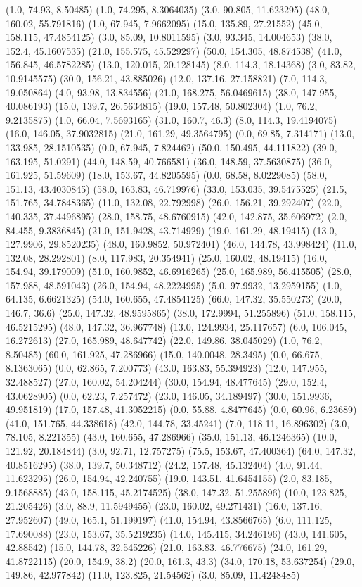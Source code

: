 {(1.0, 74.93, 8.50485) (1.0, 74.295, 8.3064035) (3.0, 90.805, 11.623295) (48.0, 160.02, 55.791816) (1.0, 67.945, 7.9662095) (15.0, 135.89, 27.21552) (45.0, 158.115, 47.4854125) (3.0, 85.09, 10.8011595) (3.0, 93.345, 14.004653) (38.0, 152.4, 45.1607535) (21.0, 155.575, 45.529297) (50.0, 154.305, 48.874538) (41.0, 156.845, 46.5782285) (13.0, 120.015, 20.128145) (8.0, 114.3, 18.14368) (3.0, 83.82, 10.9145575) (30.0, 156.21, 43.885026) (12.0, 137.16, 27.158821) (7.0, 114.3, 19.050864) (4.0, 93.98, 13.834556) (21.0, 168.275, 56.0469615) (38.0, 147.955, 40.086193) (15.0, 139.7, 26.5634815) (19.0, 157.48, 50.802304) (1.0, 76.2, 9.2135875) (1.0, 66.04, 7.5693165) (31.0, 160.7, 46.3) (8.0, 114.3, 19.4194075) (16.0, 146.05, 37.9032815) (21.0, 161.29, 49.3564795) (0.0, 69.85, 7.314171) (13.0, 133.985, 28.1510535) (0.0, 67.945, 7.824462) (50.0, 150.495, 44.111822) (39.0, 163.195, 51.0291) (44.0, 148.59, 40.766581) (36.0, 148.59, 37.5630875) (36.0, 161.925, 51.59609) (18.0, 153.67, 44.8205595) (0.0, 68.58, 8.0229085) (58.0, 151.13, 43.4030845) (58.0, 163.83, 46.719976) (33.0, 153.035, 39.5475525) (21.5, 151.765, 34.7848365) (11.0, 132.08, 22.792998) (26.0, 156.21, 39.292407) (22.0, 140.335, 37.4496895) (28.0, 158.75, 48.6760915) (42.0, 142.875, 35.606972) (2.0, 84.455, 9.3836845) (21.0, 151.9428, 43.714929) (19.0, 161.29, 48.19415) (13.0, 127.9906, 29.8520235) (48.0, 160.9852, 50.972401) (46.0, 144.78, 43.998424) (11.0, 132.08, 28.292801) (8.0, 117.983, 20.354941) (25.0, 160.02, 48.19415) (16.0, 154.94, 39.179009) (51.0, 160.9852, 46.6916265) (25.0, 165.989, 56.415505) (28.0, 157.988, 48.591043) (26.0, 154.94, 48.2224995) (5.0, 97.9932, 13.2959155) (1.0, 64.135, 6.6621325) (54.0, 160.655, 47.4854125) (66.0, 147.32, 35.550273) (20.0, 146.7, 36.6) (25.0, 147.32, 48.9595865) (38.0, 172.9994, 51.255896) (51.0, 158.115, 46.5215295) (48.0, 147.32, 36.967748) (13.0, 124.9934, 25.117657) (6.0, 106.045, 16.272613) (27.0, 165.989, 48.647742) (22.0, 149.86, 38.045029) (1.0, 76.2, 8.50485) (60.0, 161.925, 47.286966) (15.0, 140.0048, 28.3495) (0.0, 66.675, 8.1363065) (0.0, 62.865, 7.200773) (43.0, 163.83, 55.394923) (12.0, 147.955, 32.488527) (27.0, 160.02, 54.204244) (30.0, 154.94, 48.477645) (29.0, 152.4, 43.0628905) (0.0, 62.23, 7.257472) (23.0, 146.05, 34.189497) (30.0, 151.9936, 49.951819) (17.0, 157.48, 41.3052215) (0.0, 55.88, 4.8477645) (0.0, 60.96, 6.23689) (41.0, 151.765, 44.338618) (42.0, 144.78, 33.45241) (7.0, 118.11, 16.896302) (3.0, 78.105, 8.221355) (43.0, 160.655, 47.286966) (35.0, 151.13, 46.1246365) (10.0, 121.92, 20.184844) (3.0, 92.71, 12.757275) (75.5, 153.67, 47.400364) (64.0, 147.32, 40.8516295) (38.0, 139.7, 50.348712) (24.2, 157.48, 45.132404) (4.0, 91.44, 11.623295) (26.0, 154.94, 42.240755) (19.0, 143.51, 41.6454155) (2.0, 83.185, 9.1568885) (43.0, 158.115, 45.2174525) (38.0, 147.32, 51.255896) (10.0, 123.825, 21.205426) (3.0, 88.9, 11.5949455) (23.0, 160.02, 49.271431) (16.0, 137.16, 27.952607) (49.0, 165.1, 51.199197) (41.0, 154.94, 43.8566765) (6.0, 111.125, 17.690088) (23.0, 153.67, 35.5219235) (14.0, 145.415, 34.246196) (43.0, 141.605, 42.88542) (15.0, 144.78, 32.545226) (21.0, 163.83, 46.776675) (24.0, 161.29, 41.8722115) (20.0, 154.9, 38.2) (20.0, 161.3, 43.3) (34.0, 170.18, 53.637254) (29.0, 149.86, 42.977842) (11.0, 123.825, 21.54562) (3.0, 85.09, 11.4248485) }
